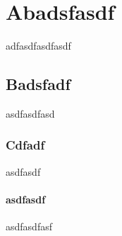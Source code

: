 \documentclass[a4paper,9pt]{scrartcl}
\begin{document}
\section{Abadsfasdf}
adfasdfasdfasdf
\subsection{Badsfadf}
asdfasdfasd
\subsubsection{Cdfadf}
asdfasdf
\paragraph{asdfasdf}
asdfasdfasf
\end{document}
